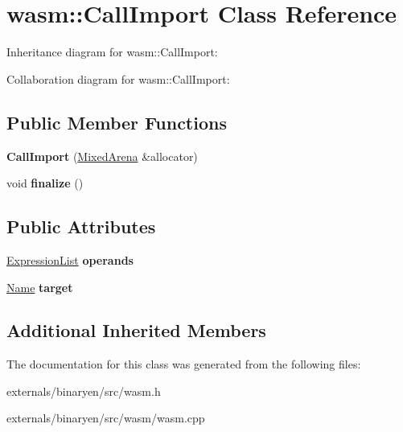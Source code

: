 \hypertarget{classwasm_1_1_call_import}{}\section{wasm\+:\+:Call\+Import Class Reference}
\label{classwasm_1_1_call_import}


Inheritance diagram for wasm\+:\+:Call\+Import\+:


Collaboration diagram for wasm\+:\+:Call\+Import\+:
\subsection*{Public Member Functions}
\begin{DoxyCompactItemize}
\item 
\mbox{\label{classwasm_1_1_call_import_a9187f5b096f4b26b7852e2ab15a98b3b}} 
{\bfseries Call\+Import} (\mbox{\hyperlink{struct_mixed_arena}{Mixed\+Arena}} \&allocator)
\item 
\mbox{\label{classwasm_1_1_call_import_a44ff47096e8392c8980e456ffc205750}} 
void {\bfseries finalize} ()
\end{DoxyCompactItemize}
\subsection*{Public Attributes}
\begin{DoxyCompactItemize}
\item 
\mbox{\label{classwasm_1_1_call_import_a22d0ebaaad9347a38019e1250b61caa5}} 
\mbox{\hyperlink{class_arena_vector}{Expression\+List}} {\bfseries operands}
\item 
\mbox{\label{classwasm_1_1_call_import_a5afa95226bc2422e00576bd0406be7b4}} 
\mbox{\hyperlink{structwasm_1_1_name}{Name}} {\bfseries target}
\end{DoxyCompactItemize}
\subsection*{Additional Inherited Members}


The documentation for this class was generated from the following files\+:\begin{DoxyCompactItemize}
\item 
externals/binaryen/src/wasm.\+h\item 
externals/binaryen/src/wasm/wasm.\+cpp\end{DoxyCompactItemize}
